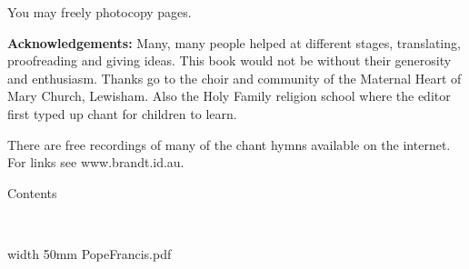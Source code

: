 {You may freely photocopy pages.



{\bf Acknowledgements:}  Many, many people helped at different stages,
translating, proofreading and giving ideas.  This book would not
be without their generosity and enthusiasm.
Thanks go to the choir and community of the Maternal Heart of Mary
Church, Lewisham.  Also the Holy Family 
religion school where the editor first typed up chant for children
to learn. 

There are free recordings of many of the chant hymns available
on the internet.  For links see www.brandt.id.au.



}

\eject

\centerline{\bigtype Contents}

\doubleline

\bigskip

\readtocfile

\vfill

\eject

\vfill
\eject


%






\ 

\vfill


\saveimageresource width 50mm {PopeFrancis.pdf}

\centerline{\useimageresource \lastsavedimageresourceindex}



